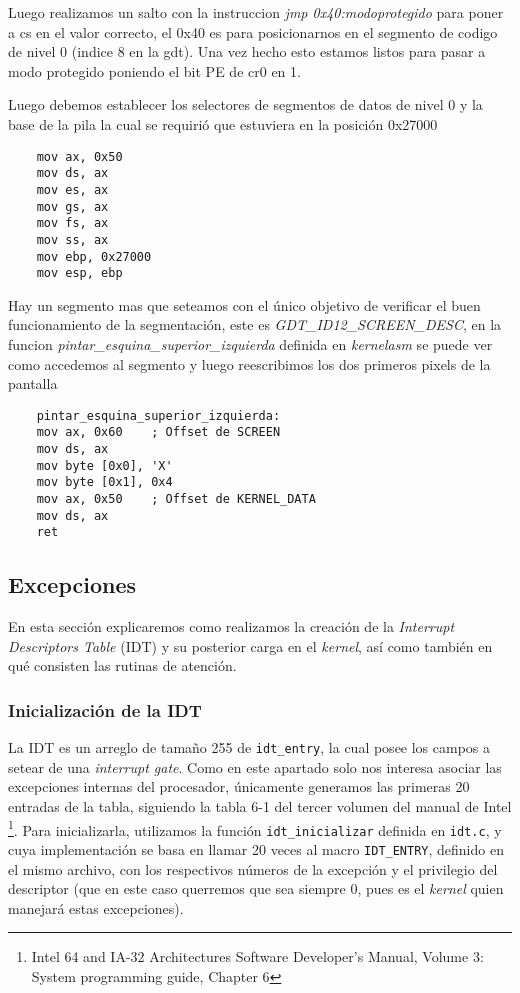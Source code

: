 Luego realizamos un salto con la instruccion \textit{jmp 0x40:modoprotegido} para poner a cs en el valor correcto, el 0x40 es para posicionarnos en el segmento de codigo de nivel 0 (indice 8 en la gdt). Una vez hecho esto estamos listos para pasar a modo protegido poniendo el bit PE de cr0 en 1. 

Luego debemos establecer los selectores de segmentos de datos de nivel 0 y la base de la pila la cual se requirió que estuviera en la posición 0x27000

\begin{lstlisting}
	mov ax, 0x50	
	mov ds, ax
	mov es, ax
	mov gs, ax
	mov fs, ax
	mov ss, ax
	mov ebp, 0x27000
	mov esp, ebp
\end{lstlisting}

Hay un segmento mas que seteamos con el único objetivo de verificar el buen funcionamiento de la segmentación, este es \textit{GDT\_ID12\_SCREEN\_DESC}, en la funcion \textit{pintar\_esquina\_superior\_izquierda} definida en \textit{kernelasm} se puede ver como accedemos al segmento y luego reescribimos los dos primeros pixels de la pantalla

\begin{lstlisting}
	pintar_esquina_superior_izquierda:
	mov ax, 0x60	; Offset de SCREEN
	mov ds, ax
	mov byte [0x0], 'X'
	mov byte [0x1], 0x4
	mov ax, 0x50	; Offset de KERNEL_DATA
	mov ds, ax
	ret	
\end{lstlisting}

\subsection{Excepciones}
\label{subsec:excepciones}
En esta sección explicaremos como realizamos la creación de la \textit{Interrupt Descriptors Table} (IDT) y su posterior carga en el \textit{kernel}, así como también en qué consisten las rutinas de atención.

\subsubsection{Inicialización de la IDT}
La IDT es un arreglo de tamaño 255 de \texttt{idt\_entry}, la cual posee los campos a setear de una \textit{interrupt gate}. Como en este apartado solo nos interesa asociar las excepciones internas del procesador, únicamente generamos las primeras 20 entradas de la tabla, siguiendo la tabla 6-1 del tercer volumen del manual de Intel \footnote{Intel 64 and IA-32 Architectures Software Developer's Manual, Volume 3: System programming guide, Chapter 6}. Para inicializarla, utilizamos la función \texttt{idt\_inicializar} definida en \texttt{idt.c}, y cuya implementación se basa en llamar 20 veces al macro \texttt{IDT\_ENTRY}, definido en el mismo archivo, con los respectivos números de la excepción y el privilegio del descriptor (que en este caso querremos que sea siempre 0, pues es el \textit{kernel} quien manejará estas excepciones).

